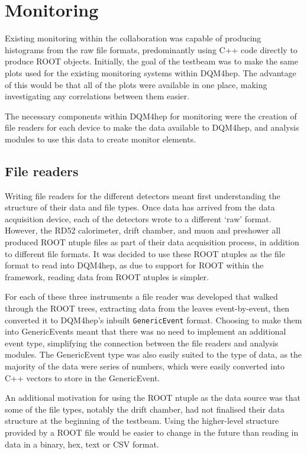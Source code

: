 \section{Monitoring}
Existing monitoring within the collaboration was capable of producing histograms from the raw file formats, predominantly using C++ code directly to produce ROOT objects. Initially, the goal of the testbeam was to make the same plots used for the existing monitoring systems within \acrshort{DQM4hep}. The advantage of this would be that all of the plots were available in one place, making investigating any correlations between them easier.

The necessary components within \acrshort{DQM4hep} for monitoring were the creation of file readers for each device to make the data available to \acrshort{DQM4hep}, and analysis modules to use this data to create monitor elements.

\subsection{File readers}
Writing file readers for the different detectors meant first understanding the structure of their data and file types. Once data has arrived from the data acquisition device, each of the detectors wrote to a different `raw' format. However, the RD52 calorimeter, drift chamber, and muon and preshower all produced ROOT ntuple files as part of their data acquisition process, in addition to different file formats. It was decided to use these ROOT ntuples as the file format to read into \acrshort{DQM4hep}, as due to support for ROOT within the framework, reading data from ROOT ntuples is simpler.

For each of these three instruments a file reader was developed that walked through the ROOT trees, extracting data from the leaves event-by-event, then converted it to \acrshort{DQM4hep}'s inbuilt \texttt{GenericEvent} format. Choosing to make them into GenericEvents meant that there was no need to implement an additional event type, simplifying the connection between the file readers and analysis modules. The GenericEvent type was also easily suited to the type of data, as the majority of the data were series of numbers, which were easily converted into C++ vectors to store in the GenericEvent.

An additional motivation for using the ROOT ntuple as the data source was that some of the file types, notably the drift chamber, had not finalised their data structure at the beginning of the testbeam. Using the higher-level structure provided by a ROOT file would be easier to change in the future than reading in data in a binary, hex, text or \acrshort{CSV} format.

